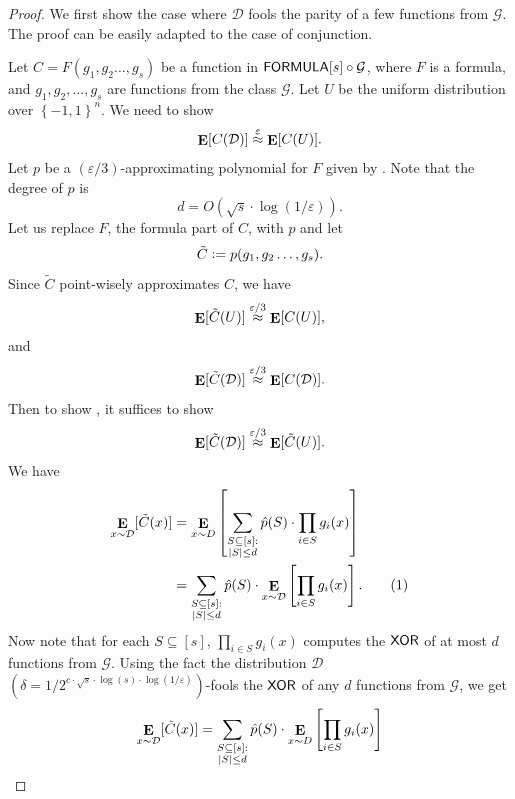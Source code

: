 \documentclass[10pt,a4paper]{article}
\DeclareMathOperator*\Exp{{\bf E}}
\newcommand{\boolpm}{\left\{-1,1\right\}}
\newcommand{\numberthis}{\addtocounter{equation}{1}\tag{\theequation}}
\newcommand{\FORMULA}{{\sf FORMULA}}
\newcommand{\XOR}{{\sf XOR}}
\newcommand{\uniform}{U}
\newcommand{\myapprox}[1]{\ensuremath{\stackrel{#1}{\approx}}}
\begin{document}
	\begin{proof}\renewcommand{\qedsymbol}{$\square$ (\Cref{thm:prg-main})}
    	We first show the case where $\mathcal{D}$ fools the parity of a few functions from $\mathcal{G}$. The proof can be easily adapted to the case of conjunction.
    	
    	Let $C=F(g_1,g_2\dots,g_s)$ be a function in $\FORMULA[s]\circ\mathcal{G}$, where $F$ is a formula, and $g_1,g_2,\dots,g_s$ are functions from the class $\mathcal{G}$. Let $\uniform$ be the uniform distribution over $\boolpm^n$. 
    	We need to show
    	\begin{equation}\label{eq:prg-1}
    		\Exp[C(\mathcal{D})] \myapprox{\varepsilon} \Exp[C(\uniform)].
    	\end{equation}
    	Let $p$ be a $(\varepsilon/3)$-approximating polynomial for $F$ given by . Note that the degree of $p$ is
    	\[
    		d=O(\sqrt{s}\cdot\log(1/\varepsilon)).
    	\] 
    	Let us replace $F$, the formula part of $C$, with $p$ and let
    	\[
    		\tilde{C}\vcentcolon=p(g_1,g_2\dots,g_s).
    	\]
    	Since $\tilde{C}$ point-wisely approximates $C$, we have
    	\[
    		\Exp[\tilde{C}(\uniform)] \myapprox{\varepsilon/3} \Exp[C(\uniform)],
    	\]
    	and
    	\[
    		\Exp[\tilde{C}(\mathcal{D})] \myapprox{\varepsilon/3} \Exp[C(\mathcal{D})].
    	\]
    	Then to show , it suffices to show
    	\[
    		\Exp[\tilde{C}(\mathcal{D})] \myapprox{\varepsilon/3} \Exp[\tilde{C}(\uniform)].
    	\]
    	We have
    	\begin{align*}
        	\label{eq:prg-2}
        	\Exp_{x\sim \mathcal{D}}[\tilde{C}(x)]&=\Exp_{x\sim D}\left[\sum_{\substack{S\subseteq[s]: \\ |S|\leq d}}\hat{p}(S)\cdot\prod_{i\in S}g_i(x)\right]\\
        	&=\sum_{\substack{S\subseteq[s]: \\ |S|\leq d}}\hat{p}(S)\cdot\Exp_{x\sim \mathcal{D}}\left[\prod_{i\in S}g_i(x)\right].
        	\numberthis
    	\end{align*}
    	Now note that for each $S\subseteq[s]$, $\prod_{i\in S}g_i(x)$ computes the $\XOR$ of at most $d$ functions from $\mathcal{G}$.
    	Using the fact the distribution $\mathcal{D}$ $\left(\delta=1/2^{c\cdot\sqrt{s}\cdot\log (s)\cdot \log(1/\varepsilon)}\right)$-fools the $\XOR$ of any $d$ functions from $\mathcal{G}$, we get
    	\begin{align*}
        	\Exp_{x\sim \mathcal{D}}[\tilde{C}(x)]&=\sum_{\substack{S\subseteq[s]: \\ |S|\leq d}}\hat{p}(S)\cdot\Exp_{x\sim D}\left[\prod_{i\in S}g_i(x)\right]\\

\end{align*}
\end{proof}
\end{document}
